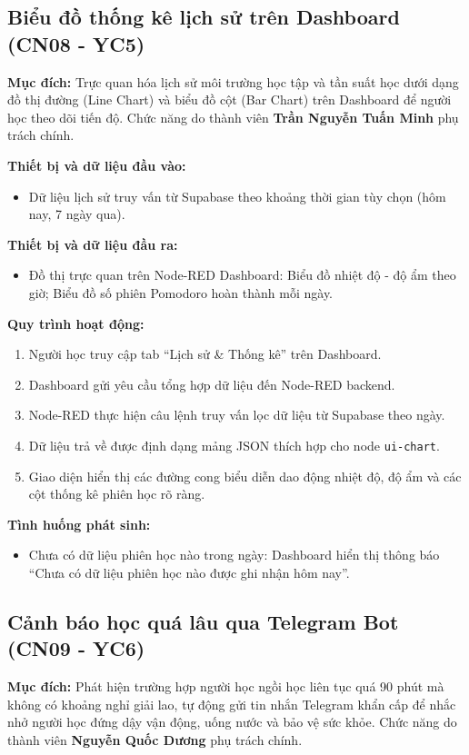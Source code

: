 \subsection{Biểu đồ thống kê lịch sử trên Dashboard (CN08 - YC5)}
\textbf{Mục đích:}
Trực quan hóa lịch sử môi trường học tập và tần suất học dưới dạng đồ thị đường (Line Chart) và biểu đồ cột (Bar Chart) trên Dashboard để người học theo dõi tiến độ. Chức năng do thành viên \textbf{Trần Nguyễn Tuấn Minh} phụ trách chính.

\textbf{Thiết bị và dữ liệu đầu vào:}
\begin{itemize}
    \item Dữ liệu lịch sử truy vấn từ Supabase theo khoảng thời gian tùy chọn (hôm nay, 7 ngày qua).
\end{itemize}

\textbf{Thiết bị và dữ liệu đầu ra:}
\begin{itemize}
    \item Đồ thị trực quan trên Node-RED Dashboard: Biểu đồ nhiệt độ - độ ẩm theo giờ; Biểu đồ số phiên Pomodoro hoàn thành mỗi ngày.
\end{itemize}

\textbf{Quy trình hoạt động:}
\begin{enumerate}
    \item Người học truy cập tab ``Lịch sử \& Thống kê'' trên Dashboard.
    \item Dashboard gửi yêu cầu tổng hợp dữ liệu đến Node-RED backend.
    \item Node-RED thực hiện câu lệnh truy vấn lọc dữ liệu từ Supabase theo ngày.
    \item Dữ liệu trả về được định dạng mảng JSON thích hợp cho node \texttt{ui-chart}.
    \item Giao diện hiển thị các đường cong biểu diễn dao động nhiệt độ, độ ẩm và các cột thống kê phiên học rõ ràng.
\end{enumerate}

\textbf{Tình huống phát sinh:}
\begin{itemize}
    \item Chưa có dữ liệu phiên học nào trong ngày: Dashboard hiển thị thông báo ``Chưa có dữ liệu phiên học nào được ghi nhận hôm nay''.
\end{itemize}

\subsection{Cảnh báo học quá lâu qua Telegram Bot (CN09 - YC6)}
\textbf{Mục đích:}
Phát hiện trường hợp người học ngồi học liên tục quá 90 phút mà không có khoảng nghỉ giải lao, tự động gửi tin nhắn Telegram khẩn cấp để nhắc nhở người học đứng dậy vận động, uống nước và bảo vệ sức khỏe. Chức năng do thành viên \textbf{Nguyễn Quốc Dương} phụ trách chính.

